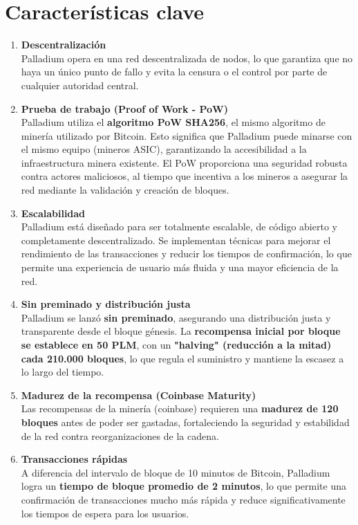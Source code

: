 \documentclass[11pt,a4paper]{article}
\begin{document}
\section{Características clave}
\begin{enumerate}
    \item \textbf{Descentralización} \\ 
    Palladium opera en una red descentralizada de nodos, lo que garantiza que no haya un único punto de fallo y evita la censura o el control por parte de cualquier autoridad central.

    \item \textbf{Prueba de trabajo (Proof of Work - PoW)} \\ 
    Palladium utiliza el \textbf{algoritmo PoW SHA256}, el mismo algoritmo de minería utilizado por Bitcoin. Esto significa que Palladium puede minarse con el mismo equipo (mineros ASIC), garantizando la accesibilidad a la infraestructura minera existente. El PoW proporciona una seguridad robusta contra actores maliciosos, al tiempo que incentiva a los mineros a asegurar la red mediante la validación y creación de bloques.

    \item \textbf{Escalabilidad} \\ 
    Palladium está diseñado para ser totalmente escalable, de código abierto y completamente descentralizado. Se implementan técnicas para mejorar el rendimiento de las transacciones y reducir los tiempos de confirmación, lo que permite una experiencia de usuario más fluida y una mayor eficiencia de la red.

    \item \textbf{Sin preminado y distribución justa} \\ 
    Palladium se lanzó \textbf{sin preminado}, asegurando una distribución justa y transparente desde el bloque génesis. La \textbf{recompensa inicial por bloque se establece en 50 PLM}, con un \textbf{"halving" (reducción a la mitad) cada 210.000 bloques}, lo que regula el suministro y mantiene la escasez a lo largo del tiempo.

    \item \textbf{Madurez de la recompensa (Coinbase Maturity)} \\ 
    Las recompensas de la minería (coinbase) requieren una \textbf{madurez de 120 bloques} antes de poder ser gastadas, fortaleciendo la seguridad y estabilidad de la red contra reorganizaciones de la cadena.

    \item \textbf{Transacciones rápidas} \\ 
    A diferencia del intervalo de bloque de 10 minutos de Bitcoin, Palladium logra un \textbf{tiempo de bloque promedio de 2 minutos}, lo que permite una confirmación de transacciones mucho más rápida y reduce significativamente los tiempos de espera para los usuarios.


\end{enumerate}
\end{document}
